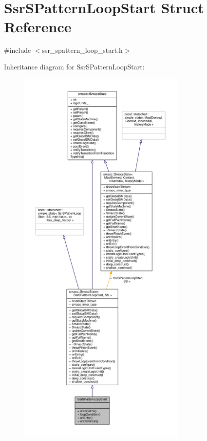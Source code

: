 \hypertarget{structSsrSPatternLoopStart}{}\section{Ssr\+S\+Pattern\+Loop\+Start Struct Reference}
\label{structSsrSPatternLoopStart}


{\ttfamily \#include $<$ssr\+\_\+spattern\+\_\+loop\+\_\+start.\+h$>$}



Inheritance diagram for Ssr\+S\+Pattern\+Loop\+Start\+:
\nopagebreak
\begin{figure}[H]
\begin{center}
\leavevmode
\includegraphics[height=550pt]{structSsrSPatternLoopStart__inherit__graph}
\end{center}
\end{figure}


